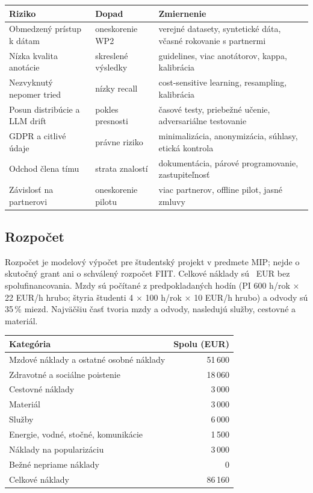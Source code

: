 \documentclass[11pt,a4paper]{article}
\begin{document}
\begin{table}[h!]
\centering
\small
\begin{tabularx}{\textwidth}{@{}p{3.3cm} X X@{}}
\toprule
Riziko & Dopad & Zmiernenie \\
\midrule
Obmedzený prístup k dátam & oneskorenie WP2 & verejné datasety, syntetické dáta, včasné rokovanie s partnermi \\
Nízka kvalita anotácie & skreslené výsledky & guidelines, viac anotátorov, kappa, kalibrácia \\
Nezvyknutý nepomer tried & nízky recall & cost-sensitive learning, resampling, kalibrácia \\
Posun distribúcie a LLM drift & pokles presnosti & časové testy, priebežné učenie, adversariálne testovanie \\
GDPR a citlivé údaje & právne riziko & minimalizácia, anonymizácia, súhlasy, etická kontrola \\
Odchod člena tímu & strata znalostí & dokumentácia, párové programovanie, zastupiteľnosť \\
Závislosť na partnerovi & oneskorenie pilotu & viac partnerov, offline pilot, jasné zmluvy \\
\bottomrule
\end{tabularx}
\end{table}

\subsection{Rozpočet}

Rozpočet je modelový výpočet pre študentský projekt v predmete MIP; nejde o skutočný grant ani o schválený rozpočet FIIT. Celkové náklady sú \budgetTotal\ EUR bez spolufinancovania. Mzdy sú počítané z predpokladaných hodín (PI 600 h/rok × 22 EUR/h hrubo; štyria študenti 4 × 100 h/rok × 10 EUR/h hrubo) a odvody sú 35\,\% miezd. Najväčšiu časť tvoria mzdy a odvody, nasledujú služby, cestovné a materiál.

\begin{table}[h!]
\centering
\small
\begin{tabularx}{\textwidth}{@{}X r@{}}
\toprule
Kategória & Spolu (EUR) \\
\midrule
Mzdové náklady a ostatné osobné náklady & 51\,600 \\
Zdravotné a sociálne poistenie & 18\,060 \\
Cestovné náklady & 3\,000 \\
Materiál & 3\,000 \\
Služby & 6\,000 \\
Energie, vodné, stočné, komunikácie & 1\,500 \\
Náklady na popularizáciu & 3\,000 \\
Bežné nepriame náklady & 0 \\
\midrule
Celkové náklady & 86\,160 \\
\bottomrule
\end{tabularx}
\end{table}
\end{document}
